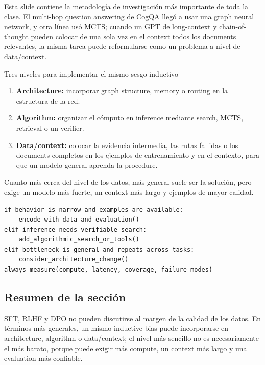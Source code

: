 Esta slide contiene la metodología de investigación más importante de toda la clase. El multi-hop question answering de CogQA llegó a usar una graph neural network, y otra línea usó MCTS; cuando un GPT de long-context y chain-of-thought pueden colocar de una sola vez en el context todos los documents relevantes, la misma tarea puede reformularse como un problema a nivel de data/context.


\begin{importantbox}{Tres niveles para implementar el mismo sesgo inductivo}
\begin{enumerate}
  \item \textbf{Architecture:} incorporar graph structure, memory o routing en la estructura de la red.
  \item \textbf{Algorithm:} organizar el cómputo en inference mediante search, MCTS, retrieval o un verifier.
  \item \textbf{Data/context:} colocar la evidencia intermedia, las rutas fallidas o los documents completos en los ejemplos de entrenamiento y en el contexto, para que un modelo general aprenda la procedure.
\end{enumerate}
Cuanto más cerca del nivel de los datos, más general suele ser la solución, pero exige un modelo más fuerte, un context más largo y ejemplos de mayor calidad.
\end{importantbox}

\begin{lstlisting}[caption={Marco de decisión para elegir entre data, algorithm o architecture}]
if behavior_is_narrow_and_examples_are_available:
    encode_with_data_and_evaluation()
elif inference_needs_verifiable_search:
    add_algorithmic_search_or_tools()
elif bottleneck_is_general_and_repeats_across_tasks:
    consider_architecture_change()
always_measure(compute, latency, coverage, failure_modes)
\end{lstlisting}



\subsection{Resumen de la sección}

SFT, RLHF y DPO no pueden discutirse al margen de la calidad de los datos. En términos más generales, un mismo inductive bias puede incorporarse en architecture, algorithm o data/context; el nivel más sencillo no es necesariamente el más barato, porque puede exigir más compute, un context más largo y una evaluation más confiable.
